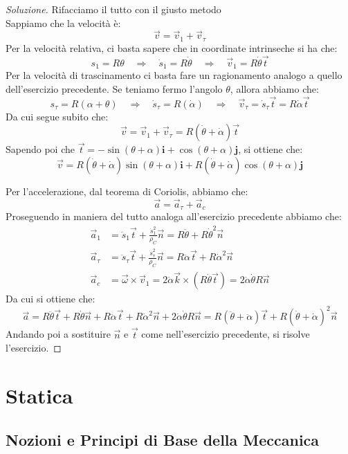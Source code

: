 \documentclass[11pt,a4paper,twoside]{article}
\theoremstyle{definition}
\newenvironment{sol}
	{\renewcommand\qedsymbol{$\blacksquare$}\begin{proof}[Soluzione]}
	{\end{proof}}
\begin{document}
\begin{sol}
	Rifacciamo il tutto con il giusto metodo\\
	Sappiamo che la velocità è:
	\[ \vec v = \vec v_1 + \vec v_\tau\]
	Per la velocità relativa, ci basta sapere che in coordinate intrinseche si ha che:
	\[s_1 = R \theta \quad \Rightarrow \quad \dot s_1 = R\dot \theta \quad \Rightarrow \quad \vec v_1 = R \dot \theta \vec t\]
	Per la velocità di trascinamento ci basta fare un ragionamento analogo a quello dell'esercizio precedente. Se teniamo fermo l'angolo $\theta$, allora abbiamo che:
	\[ s_\tau = R(\alpha + \theta) \quad \Rightarrow \quad \dot s_\tau = R(\dot \alpha) \quad \Rightarrow \quad \vec v_\tau = \dot s_\tau \vec t = R \dot \alpha \vec t\]
	Da cui segue subito che:
	\[\vec v = \vec v_1 + \vec v_\tau = R(\dot \theta + \dot \alpha)\vec t\]
	Sapendo poi che $\vec t = -\sin(\theta + \alpha) \mathbf i + \cos(\theta + \alpha) \mathbf j$, si ottiene che:
	\[ \vec v = R(\dot \theta + \dot \alpha)\sin(\theta + \alpha)\mathbf i + R(\dot \theta +\dot \alpha)\cos(\theta + \alpha)\mathbf j \]

	Per l'accelerazione, dal teorema di Coriolis, abbiamo che:
	\[ \vec a = \vec a_\tau + \vec a_c \]
	Proseguendo in maniera del tutto analoga all'esercizio precedente abbiamo che:
	\begin{align*}
		\vec a_1 &= \ddot s_1\vec t + \frac{\dot s_1^2}{\rho_C}\vec n = R \ddot \theta + R\dot \theta^2 \vec n\\
		\vec a_\tau &= \ddot s_\tau \vec t + \frac{\dot s_\tau^2}{\rho_C}\vec n = R \ddot \alpha \vec t + R \dot \alpha^2 \vec n\\
		\vec a_c &= \vec \omega \times \vec v_1 = 2 \dot \alpha \vec k \times (R \dot \theta \vec t) = 2 \dot \alpha \dot \theta R \vec n
	\end{align*}
	Da cui si ottiene che:
	\[ \vec a = R\ddot \theta \vec t + R \dot \theta \vec n + R \ddot \alpha \vec t + R \dot \alpha^2 \vec n + 2 \dot \alpha \dot \theta R \vec n = R(\ddot \theta + \ddot \alpha) \vec t + R(\dot \theta + \dot \alpha)^2 \vec n \]
	Andando poi a sostituire $\vec n$ e $\vec t$ come nell'esercizio precedente, si risolve l'esercizio.
\end{sol}

\newpage

\section{Statica}

\subsection{Nozioni e Principi di Base della Meccanica}
\end{document}
